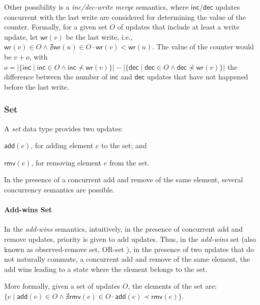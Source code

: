 \documentclass[11pt,a4paper]{article}
\def\land{\mathrel{\wedge}}
\begin{document}
Other possibility is a \emph{inc/dec-write merge} semantics, where $\mathsf{inc}$/$\mathsf{dec}$ 
updates concurrent with the last write are considered for determining the value
of the counter.  
Formally, for a given set $O$ of updates that include at least a write update, 
let $\mathsf{wr}(v)$ be the last write, i.e., $\mathsf{wr}(v) \in O \land \nexists \mathsf{wr}(u) \in O \cdot \mathsf{wr}(v) < \mathsf{wr}(u)$. 
The value of the counter would be
$v + o$, 
with $o = \left| \{ \mathsf{inc} \mid \mathsf{inc} \in O \wedge \mathsf{inc} \not \prec \mathsf{wr}(v)\} \right| - \left| \{ \mathsf{dec} \mid \mathsf{dec} \in O \wedge \mathsf{dec} \not \prec \mathsf{wr}(v)\} \right|$
the difference between the number of $\mathsf{inc}$ and $\mathsf{dec}$ updates that have not happened before the last write.








\subsubsection{Set}

A \emph{set} data type provides two updates:
\begin{inparaenum}[(i)]
\item $\mathsf{add}(e)$, for adding element $e$ to the set; and 
\item $\mathsf{rmv}(e)$, for removing element $e$ from the set.
\end{inparaenum}
In the presence of a concurrent add and remove of the same element,
several concurrency semantics are possible.

\paragraph{Add-wins Set}
In the \emph{add-wins} semantics, intuitively, in the presence of concurrent 
add and remove updates, priority is given to add updates.
Thus, in the \emph{add-wins} set (also known as observed-remove set, OR-set 
\cite{Shapiro11Conflict}), in the presence of two updates that do not 
naturally commute, a concurrent add and remove of the same element, the 
add wins leading to a state where the element belongs to the set.

More formally, given a set of updates $O$, the elements of the set are:
$\{e \mid \mathsf{add}(e) \in O \land \nexists \mathsf{rmv}(e) \in O \cdot \mathsf{add}(e) \prec \mathsf{rmv}(e)\}$.
\end{document}
